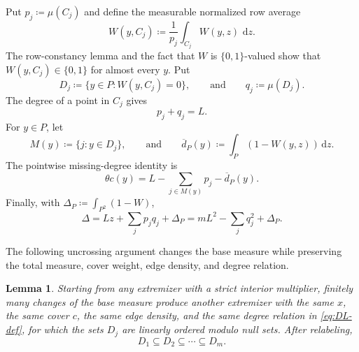 \documentclass[10pt]{article}
\numberwithin{equation}{section}
\newtheorem{lemma}[lemma]{Lemma}
\newcommand{\dd}{\,\mathrm d}
\begin{document}
Put $p_j\coloneqq\mu(C_j)$ and define the measurable normalized row average
\[
 W(y,C_j)\coloneqq\frac1{p_j}\int_{C_j}W(y,z)\,\dd z.
\]
The row-constancy lemma and the fact that $W$ is $\{0,1\}$-valued show that $W(y,C_j)\in\{0,1\}$ for almost every $y$.  Put
\[
 D_j\coloneqq\{y\in P\colon W(y,C_j)=0\},
 \qquad\text{and}\qquad
 q_j\coloneqq\mu(D_j).
\]
The degree of a point in $C_j$ gives
\begin{equation}\label{eq:pqL}
 p_j+q_j=L.
\end{equation}
For $y\in P$, let
\[
 M(y)\coloneqq\{j\colon y\in D_j\},
 \qquad\text{and}\qquad
 \overline d_P(y)\coloneqq\int_P(1-W(y,z))\dd z.
\]
The pointwise missing-degree identity is
\begin{equation}\label{eq:point-defect}
 \theta c(y)=L-\sum_{j\in M(y)}p_j-\overline d_P(y).
\end{equation}
Finally, with $\Delta_P\coloneqq\int_{P^2}(1-W)$,
\begin{equation}\label{eq:global-defect}
 \Delta=Lz+\sum_jp_jq_j+\Delta_P
 =mL^2-\sum_jq_j^2+\Delta_P.
\end{equation}

The following uncrossing argument changes the base measure while preserving the total measure, cover weight, edge density, and degree relation.

\begin{lemma}\label{lem:finite-uncrossing}
Starting from any extremizer with a strict interior multiplier, finitely many changes of the base measure produce another extremizer with the same $x$, the same cover $c$, the same edge density, and the same degree relation in \cref{eq:DL-def}, for which the sets $D_j$ are linearly ordered modulo null sets.  After relabeling,
\begin{equation}\label{eq:nested-defects}
 D_1\subseteq D_2\subseteq\cdots\subseteq D_m.
\end{equation}
\end{lemma}
\end{document}
